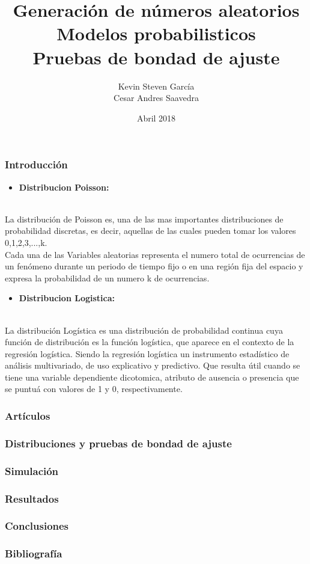 \documentclass[12pt]{beamer}
\author{Kevin Steven García \\ Cesar Andres Saavedra}
\title{Generación de números aleatorios \\ Modelos probabilisticos \\ Pruebas de bondad de ajuste}
\institute{Universdiad del Valle \\ Estadística \\ Simulación Estadística}
\date{Abril 2018}
\begin{document}
\begin{frame}
\titlepage
\end{frame}


\begin{frame}
\frametitle{Introducción}
\begin{itemize}
	\item\textbf{Distribucion Poisson:} 
\end{itemize}
~\\La distribución de Poisson es, una de las mas importantes distribuciones de probabilidad discretas, es decir, aquellas de las cuales pueden tomar los valores 0,1,2,3,...,k.  
~\\Cada una de las Variables aleatorias representa el numero total de ocurrencias de un fenómeno durante un periodo de tiempo fijo o en una región fija del espacio y expresa la probabilidad de un numero k de ocurrencias.
\end{frame}

\begin{frame}
\begin{itemize}
	\item\textbf{Distribucion Logistica:}
\end{itemize}
~\\La distribución Logística es una distribución de probabilidad continua cuya función de distribución es la función logística, que aparece en el contexto de la regresión logística. Siendo la regresión logística un instrumento estadístico de análisis multivariado, de uso explicativo y predictivo. Que resulta útil cuando se tiene una variable dependiente dicotomica, atributo de ausencia o presencia que se puntuá con valores de 1 y 0, respectivamente. 
\end{frame}

\begin{frame}
\frametitle{ Artículos}
\end{frame}

\begin{frame}
\frametitle{Distribuciones y pruebas de bondad de ajuste}
\end{frame}

\begin{frame}
\frametitle{Simulación}
\end{frame}

\begin{frame}
\frametitle{Resultados}
\end{frame}

\begin{frame}
\frametitle{Conclusiones}
\end{frame}

\begin{frame}
\frametitle{Bibliografía}
\end{frame}
\end{document}
